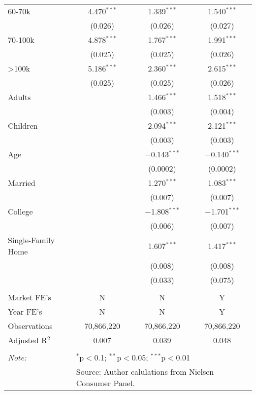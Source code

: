 \begin{table}[!htbp]
\begin{tabular}{@{\extracolsep{5pt}}lccc}
  60-70k & 4.470$^{***}$ & 1.339$^{***}$ & 1.540$^{***}$ \\ 
  & (0.026) & (0.026) & (0.027) \\ 
  70-100k & 4.878$^{***}$ & 1.767$^{***}$ & 1.991$^{***}$ \\ 
  & (0.025) & (0.025) & (0.026) \\ 
  >100k & 5.186$^{***}$ & 2.360$^{***}$ & 2.615$^{***}$ \\ 
  & (0.025) & (0.025) & (0.026) \\ 
  Adults &  & 1.466$^{***}$ & 1.518$^{***}$ \\ 
  &  & (0.003) & (0.004) \\ 
  Children &  & 2.094$^{***}$ & 2.121$^{***}$ \\ 
  &  & (0.003) & (0.003) \\ 
  Age &  & $-$0.143$^{***}$ & $-$0.140$^{***}$ \\ 
  &  & (0.0002) & (0.0002) \\ 
  Married &  & 1.270$^{***}$ & 1.083$^{***}$ \\ 
  &  & (0.007) & (0.007) \\ 
  College &  & $-$1.808$^{***}$ & $-$1.701$^{***}$ \\ 
  &  & (0.006) & (0.007) \\ 
  Single-Family Home &  & 1.607$^{***}$ & 1.417$^{***}$ \\ 
  &  & (0.008) & (0.008) \\ 
  &  & (0.033) & (0.075) \\ 
 \hline \\[-1.8ex] 
Market FE's & N & N & Y \\ 
Year FE's & N & N & Y \\ 
Observations & 70,866,220 & 70,866,220 & 70,866,220 \\ 
Adjusted R$^{2}$ & 0.007 & 0.039 & 0.048 \\ 
\hline 
\hline \\[-1.8ex] 
\textit{Note:}  & \multicolumn{3}{l}{$^{*}$p$<$0.1; $^{**}$p$<$0.05; $^{***}$p$<$0.01} \\ 
 & \multicolumn{3}{l}{Source: Author calulations from Nielsen Consumer Panel.} \\ 
\end{tabular} 
\end{table} 
